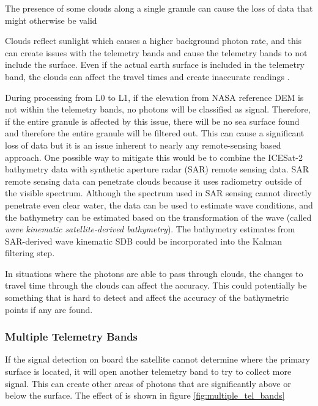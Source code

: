 The presence of some clouds along a single granule can cause the loss of data that might otherwise be valid

Clouds reflect sunlight which causes a higher background photon rate, and this can create issues with the telemetry bands and cause the telemetry bands to not include the surface. Even if the actual earth surface is included in the telemetry band, the clouds can affect the travel times and create inaccurate readings \parencite{atl03knownissues}.

During processing from L0 to L1, if the elevation from NASA reference DEM is not within the telemetry bands, no photons will be classified as signal. Therefore, if the entire granule is affected by this issue, there will be no sea surface found and therefore the entire granule will be filtered out. This can cause a significant loss of data but it is an issue inherent to nearly any remote-sensing based approach. One possible way to mitigate this would be to combine the ICESat-2 bathymetry data with synthetic aperture radar (SAR) remote sensing data. SAR remote sensing data can penetrate clouds because it uses radiometry outside of the visible spectrum. Although the spectrum used in SAR sensing cannot directly penetrate even clear water, the data can be used to estimate wave conditions, and the bathymetry can be estimated based on the transformation of the wave (called \emph{wave kinematic satellite-derived bathymetry}). The bathymetry estimates from SAR-derived wave kinematic SDB could be incorporated into the Kalman filtering step. 

In situations where the photons are able to pass through clouds, the changes to travel time through the clouds can affect the accuracy. This could potentially be something that is hard to detect and affect the accuracy of the bathymetric points if any are found.
 

\subsubsection{Multiple Telemetry Bands}

If the signal detection on board the satellite cannot determine where the primary surface is located, it will open another telemetry band to try to collect more signal. This can create other areas of photons that are significantly above or below the surface. The effect of is shown in figure \ref{fig:multiple_tel_bands}


